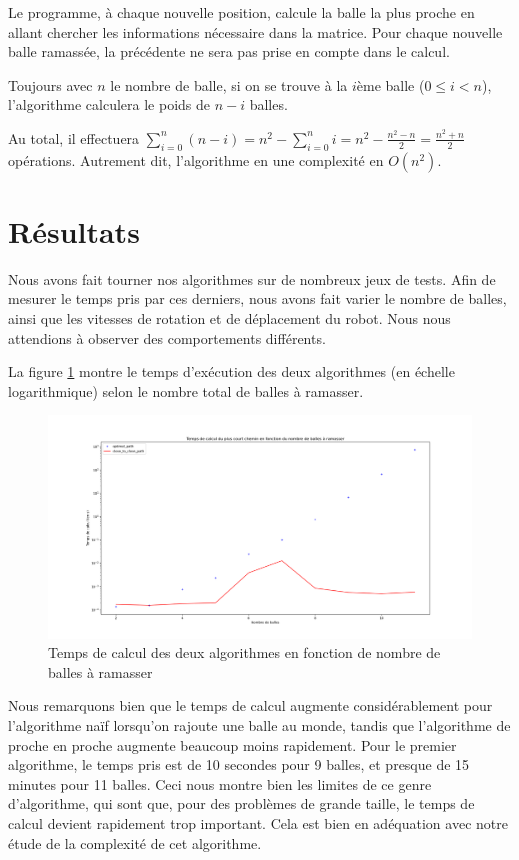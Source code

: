 \documentclass[12pt]{article}
\begin{document}
    Le programme, à chaque nouvelle position, calcule la balle la plus proche en allant chercher les informations nécessaire dans la matrice. Pour chaque nouvelle balle ramassée, la précédente ne sera pas prise en compte dans le calcul.

    Toujours avec $n$ le nombre de balle, si on se trouve à la $i$ème balle ($0\leq i<n$), l'algorithme calculera le poids de $n-i$ balles.
    
    Au total, il effectuera $\sum_{i=0}^{n}(n-i) = n^2 - \sum_{i=0}^{n}i = n^2 - \frac{n^2 - n}{2} = \frac{n^2 + n}{2}$ opérations. Autrement dit, l'algorithme en une complexité en $O(n^2)$.

    \section{Résultats}
    \label{sec:result}

    Nous avons fait tourner nos algorithmes sur de nombreux jeux de tests. Afin de mesurer le temps pris par ces derniers, nous avons fait varier le nombre de balles, ainsi que les vitesses de rotation et de déplacement du robot. Nous nous attendions à observer des comportements différents.

    La figure \ref{fig:timepathopt} montre le temps d'exécution des deux algorithmes (en échelle logarithmique) selon le nombre total de balles à ramasser. 

    \begin{figure}[H]
        \centering
        \includegraphics[width=\textwidth]{img/time_path_opt}
        \caption{Temps de calcul des deux algorithmes en fonction de nombre de balles à ramasser}
        \label{fig:timepathopt}
    \end{figure}

    Nous remarquons bien que le temps de calcul augmente considérablement pour l'algorithme naïf lorsqu'on rajoute une balle au monde, tandis que l'algorithme de proche en proche augmente beaucoup moins rapidement. Pour le premier algorithme, le temps pris est de 10 secondes pour 9 balles, et presque de 15 minutes pour 11 balles. Ceci nous montre bien les limites de ce genre d'algorithme, qui sont que, pour des problèmes de grande taille, le temps de calcul devient rapidement trop important. Cela est bien en adéquation avec notre étude de la complexité de cet algorithme.
\end{document}
